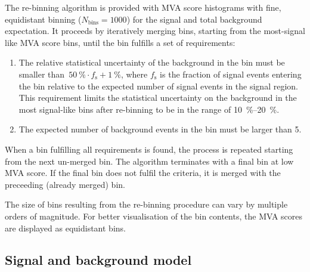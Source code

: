 The re-binning algorithm is provided with MVA score histograms with
fine, equidistant binning ($N_\text{bins} = 1000$) for the signal and
total background expectation. It proceeds by iteratively merging bins,
starting from the most-signal like MVA score bins, until the bin
fulfills a set of requirements:
\begin{enumerate}

\item The relative statistical uncertainty of the background in the
  bin must be smaller
  than~\mbox{$\SI{50}{\percent} \cdot f_\text{s} + \SI{1}{\percent}$},
  where $f_\text{s}$ is the fraction of signal events entering the bin
  relative to the expected number of signal events in the signal
  region. This requirement limits the statistical uncertainty on the
  background in the most signal-like bins after re-binning to be in
  the range of \SIrange{10}{20}{\percent}.

\item The expected number of background events in the bin must be
  larger than 5.

\end{enumerate}
When a bin fulfilling all requirements is found, the process is
repeated starting from the next un-merged bin. The algorithm
terminates with a final bin at low MVA score. If the final bin does
not fulfil the criteria, it is merged with the preceeding (already
merged) bin.



The size of bins resulting from the re-binning procedure can vary by
multiple orders of magnitude. For better visualisation of the bin
contents, the MVA scores are displayed as equidistant bins.



\subsection{Signal and background model}

